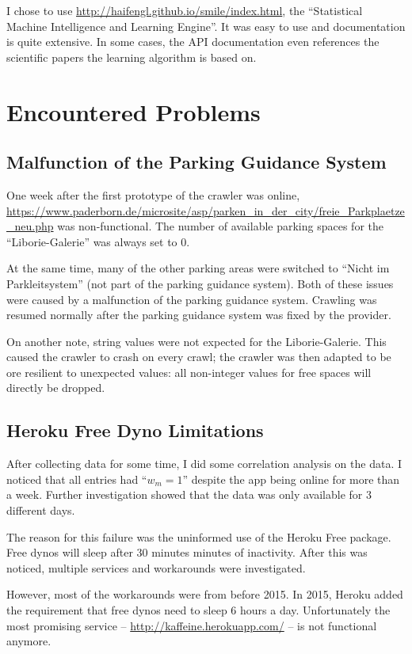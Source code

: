 \documentclass[journal,10pt]{IEEEtran}
\newcommand{\wom}{w_m}
\begin{document}
I chose to use \href{Smile}{http://haifengl.github.io/smile/index.html}, the ``Statistical Machine Intelligence and Learning Engine''. It was easy to use and documentation is quite extensive. In some cases, the API documentation even references the scientific papers the learning algorithm is based on. 


\section{Encountered Problems}\label{sec:challenges}
\subsection{Malfunction of the Parking Guidance System}
One week after the first prototype of the crawler was online, \url{https://www.paderborn.de/microsite/asp/parken_in_der_city/freie_Parkplaetze_neu.php} was non-functional. The number of available parking spaces for the ``Liborie-Galerie'' was always set to \(0\).

At the same time, many of the other parking areas were switched to ``Nicht im Parkleitsystem'' (not part of the parking guidance system). Both of these issues were caused by a malfunction of the parking guidance system. Crawling was resumed normally after the parking guidance system was fixed by the provider.

On another note, string values were not expected for the Liborie-Galerie. This caused the crawler to crash on every crawl; the crawler was then adapted to be ore resilient to unexpected values: all non-integer values for free spaces will directly be dropped.

\subsection{Heroku Free Dyno Limitations}

After collecting data for some time, I did some correlation analysis on the data. I noticed that all entries had ``\(\wom = 1\)'' despite the app being online for more than a week. Further investigation showed that the data was only available for 3 different days. 

The reason for this failure was the uninformed use of the Heroku Free package. Free dynos will sleep after 30 minutes minutes of inactivity. After this was noticed, multiple services and workarounds were investigated.

However, most of the workarounds were from before 2015. In 2015, Heroku added the requirement that free dynos need to sleep 6 hours a day. Unfortunately the most promising service -- \url{http://kaffeine.herokuapp.com/} -- is not functional anymore.
\end{document}
